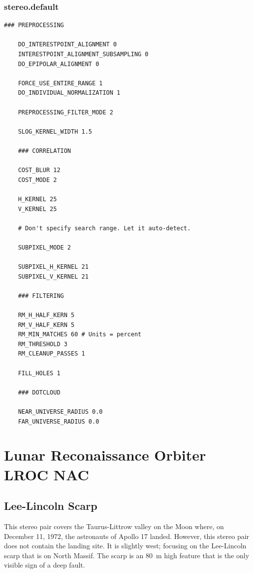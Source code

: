 \vfill

\subsubsection*{stereo.default}

\begin{center}\begin{minipage}{5.5in}
\begin{Verbatim}[frame=single,fontsize=\small,label=stereo.default for MOC North Tharsis]
    ### PREPROCESSING

    DO_INTERESTPOINT_ALIGNMENT 0
    INTERESTPOINT_ALIGNMENT_SUBSAMPLING 0
    DO_EPIPOLAR_ALIGNMENT 0

    FORCE_USE_ENTIRE_RANGE 1
    DO_INDIVIDUAL_NORMALIZATION 1

    PREPROCESSING_FILTER_MODE 2

    SLOG_KERNEL_WIDTH 1.5

    ### CORRELATION

    COST_BLUR 12
    COST_MODE 2

    H_KERNEL 25
    V_KERNEL 25

    # Don't specify search range. Let it auto-detect.

    SUBPIXEL_MODE 2

    SUBPIXEL_H_KERNEL 21
    SUBPIXEL_V_KERNEL 21

    ### FILTERING

    RM_H_HALF_KERN 5
    RM_V_HALF_KERN 5
    RM_MIN_MATCHES 60 # Units = percent
    RM_THRESHOLD 3
    RM_CLEANUP_PASSES 1

    FILL_HOLES 1

    ### DOTCLOUD

    NEAR_UNIVERSE_RADIUS 0.0
    FAR_UNIVERSE_RADIUS 0.0
\end{Verbatim}
\end{minipage}\end{center}

\pagebreak

\section{Lunar Reconaissance Orbiter LROC NAC}

\subsection{Lee-Lincoln Scarp}

This stereo pair covers the Taurus-Littrow valley on the Moon where,
on December 11, 1972, the astronauts of Apollo 17 landed. However,
this stereo pair does not contain the landing site.  It is slightly
west; focusing on the Lee-Lincoln scarp that is on North Massif. The
scarp is an 80~m high feature that is the only visible sign of a deep
fault.

